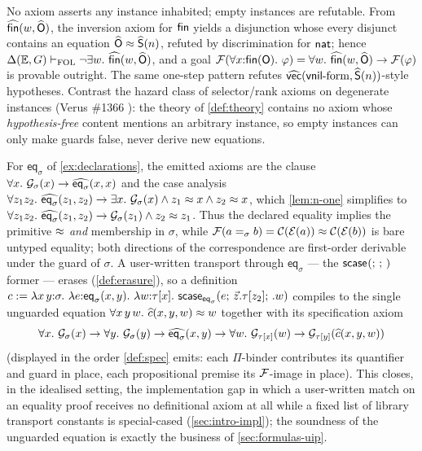 \begin{example}
\label{ex:fin-empty}
No axiom asserts any instance inhabited; empty instances are refutable.
From $\widehat{\mathsf{fin}}(w, \widehat{\mathsf{O}})$, the inversion axiom for $\mathsf{fin}$
yields a disjunction whose every disjunct contains an equation
$\widehat{\mathsf{O}} \approx \widehat{\mathsf{S}}(n)$, refuted by discrimination for $\mathsf{nat}$;
hence $\Delta(\mathbb{E},G) \vdash_{\mathrm{FOL}} \neg \exists w.\ \widehat{\mathsf{fin}}(w, \widehat{\mathsf{O}})$,
and a goal $\mathcal{F}(\forall x{:}\mathsf{fin}(\mathsf{O}).\ \varphi) = \forall w.\
\widehat{\mathsf{fin}}(w,\widehat{\mathsf{O}}) \to \mathcal{F}(\varphi)$ is provable outright.  The
same one-step pattern refutes $\widehat{\mathsf{vec}}(\mathsf{vnil}\text{-form},
\widehat{\mathsf{S}}(n))$-style hypotheses.  Contrast the hazard class of
selector/rank axioms on degenerate instances (Verus \#1366
\cite{Verus1366}): the theory of \cref{def:theory} contains no axiom
whose \emph{hypothesis-free} content mentions an arbitrary instance, so
empty instances can only make guards false, never derive new equations.
\end{example}

\begin{example}
\label{ex:eq-pred}
For $\mathsf{eq}_\sigma$ of \cref{ex:declarations}, the emitted axioms
are the clause
$\forall x.\ \guard{\sigma}{x} \to \Ihat{\mathsf{eq}_\sigma}(x,x)$ and
the case analysis $\forall z_1 z_2.\ \Ihat{\mathsf{eq}_\sigma}(z_1,z_2)
\to \exists x.\ \guard{\sigma}{x} \wedge z_1 \feq x \wedge z_2 \feq x$,
which \cref{lem:n-one} simplifies to $\forall z_1 z_2.\
\widehat{\mathsf{eq}_\sigma}(z_1,z_2) \to \mathcal{G}_{\sigma}(z_1) \wedge z_2
\approx z_1$.  Thus the declared equality implies the primitive $\approx$
\emph{and} membership in $\sigma$, while $\mathcal{F}(a =_\sigma b) =
\mathcal{C}(\mathcal{E}(a)) \approx \mathcal{C}(\mathcal{E}(b))$ is bare untyped equality; both
directions of the correspondence are first-order derivable under the
guard of $\sigma$.  A user-written transport through
$\mathsf{eq}_\sigma$ --- the $\mathsf{scase}_{}(;\,;\,)$ former --- erases
(\cref{def:erasure}), so a definition
$c \defeq \lambda x\,y{:}\sigma.\ \lambda e{:}\mathsf{eq}_\sigma(x,y).\
\lambda w{:}\tau[x].\ \tscase{\mathsf{eq}_\sigma}{e}{\tup{z}.\tau[z_2]}{.w}$
compiles to the single unguarded equation $\forall x\,y\,w.\
\widehat{c}(x,y,w) \approx w$ together with its specification axiom
\[
  \forall x.\ \mathcal{G}_{\sigma}(x) \to \forall y.\ \mathcal{G}_{\sigma}(y) \to
  \widehat{\mathsf{eq}_\sigma}(x,y) \to
  \forall w.\ \mathcal{G}_{\tau[x]}(w) \to
  \mathcal{G}_{\tau[y]}(\widehat{c}(x,y,w))
\]
(displayed in the order \cref{def:spec} emits: each $\Pi$-binder
contributes its quantifier and guard in place, each propositional
premise its $\mathcal{F}$-image in place).
This closes, in the idealised setting, the implementation gap in which
a user-written match on an equality proof receives no definitional
axiom at all while a fixed list of library transport constants is
special-cased (\cref{sec:intro-impl}); the soundness of the unguarded
equation is exactly the business of \cref{sec:formulas-uip}.
\end{example}

